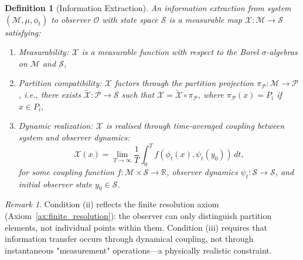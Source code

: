 \documentclass[twocolumn,10pt,a4paper]{article}
\newtheorem{definition}[theorem]{Definition}
\theoremstyle{remark}
\newtheorem{remark}[theorem]{Remark}
\newcommand{\manifold}{\mathcal{M}}
\newcommand{\partition}{\mathcal{P}}
\newcommand{\Reals}{\mathbb{R}}
\begin{document}
\begin{definition}[Information Extraction]
\label{def:information_extraction}
An \emph{information extraction} from system $(\manifold, \mu, \phi_t)$ to observer $\mathcal{O}$ with state space $\mathcal{S}$ is a measurable map $\mathcal{X}: \manifold \to \mathcal{S}$ satisfying:
\begin{enumerate}[label=(\roman*), noitemsep]
    \item \emph{Measurability}: $\mathcal{X}$ is a measurable function with respect to the Borel $\sigma$-algebras on $\manifold$ and $\mathcal{S}$,
    \item \emph{Partition compatibility}: $\mathcal{X}$ factors through the partition projection $\pi_{\partition}: \manifold \to \partition$, i.e., there exists $\tilde{\mathcal{X}}: \partition \to \mathcal{S}$ such that $\mathcal{X} = \tilde{\mathcal{X}} \circ \pi_{\partition}$, where $\pi_{\partition}(x) = P_i$ if $x \in P_i$,
    \item \emph{Dynamic realization}: $\mathcal{X}$ is realised through time-averaged coupling between system and observer dynamics:
    \begin{equation}
    \mathcal{X}(x) = \lim_{T \to \infty} \frac{1}{T} \int_0^T f(\phi_t(x), \psi_t(y_0)) \, dt,
    \end{equation}
    for some coupling function $f: \manifold \times \mathcal{S} \to \Reals$, observer dynamics $\psi_t: \mathcal{S} \to \mathcal{S}$, and initial observer state $y_0 \in \mathcal{S}$.
\end{enumerate}
\end{definition}

\begin{remark}
Condition (ii) reflects the finite resolution axiom (Axiom~\ref{ax:finite_resolution}): the observer can only distinguish partition elements, not individual points within them. Condition (iii) requires that information transfer occurs through dynamical coupling, not through instantaneous "measurement" operations—a physically realistic constraint.
\end{remark}
\end{document}
